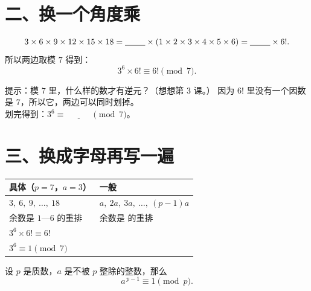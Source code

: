 \section*{二、换一个角度乘}

\begin{dongshou}
  \[
    3\times6\times9\times12\times15\times18
    =\underline{\hspace{2.4em}}\times(1\times2\times3\times4\times5\times6)
    =\underline{\hspace{2.4em}}\times 6! .
  \]
  所以两边取模 \(7\) 得到：
  \[
    3^{6}\times6!\equiv6! \pmod 7 .
  \]
\end{dongshou}

\begin{sikao}[为什么能把 \(6!\) 划掉？]
  提示：模 \(7\) 里，什么样的数才有逆元？（想想第 3 课。）
  因为 \(6!\) 里没有一个因数是 \(7\)，所以它\underline{\hspace{3em}}，两边可以同时划掉。\\[4pt]
  划完得到：\(3^{6}\equiv\underline{\hspace{3em}}\pmod 7\)。
\end{sikao}

\section*{三、换成字母再写一遍}

\begin{example}
  \begin{center}
  \begin{tabular}{@{}ll@{}}
    \toprule
    \textbf{具体}（\(p=7\)，\(a=3\)） & \textbf{一般} \\
    \midrule
    \(3,\ 6,\ 9,\ \dots,\ 18\) & \(a,\ 2a,\ 3a,\ \dots,\ (p-1)a\) \\
    余数是 \(1\text{—}6\) 的重排 & 余数是 \underline{\hspace{3.4em}} 的重排 \\
    \(3^{6}\times6!\equiv6!\) & \underline{\hspace{5.4em}} \\
    \(3^{6}\equiv1 \pmod 7\) & \underline{\hspace{5.4em}} \\
    \bottomrule
  \end{tabular}
  \end{center}
\end{example}

\begin{dingli}[费马小定理]
  设 \(p\) 是质数，\(a\) 是不被 \(p\) 整除的整数，那么
  \[
    a^{\,p-1}\equiv1 \pmod p .
  \]
\end{dingli}

